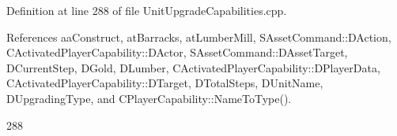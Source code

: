 Definition at line 288 of file Unit\+Upgrade\+Capabilities.\+cpp.



References aa\+Construct, at\+Barracks, at\+Lumber\+Mill, S\+Asset\+Command\+::\+D\+Action, C\+Activated\+Player\+Capability\+::\+D\+Actor, S\+Asset\+Command\+::\+D\+Asset\+Target, D\+Current\+Step, D\+Gold, D\+Lumber, C\+Activated\+Player\+Capability\+::\+D\+Player\+Data, C\+Activated\+Player\+Capability\+::\+D\+Target, D\+Total\+Steps, D\+Unit\+Name, D\+Upgrading\+Type, and C\+Player\+Capability\+::\+Name\+To\+Type().


\begin{DoxyCode}
288                                                                                                            
                                                                                                                  

\end{DoxyCode}
